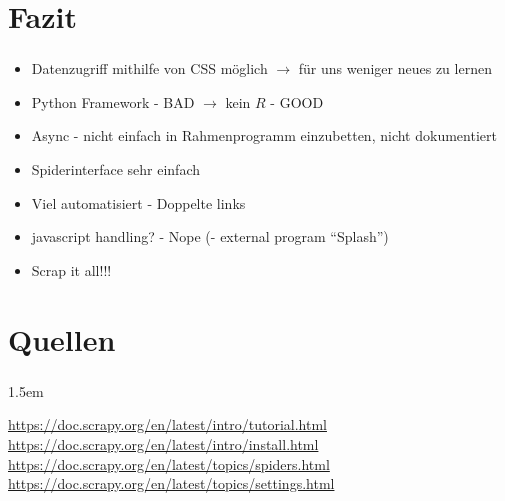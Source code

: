 \documentclass{beamer}
\begin{document}

\section{Fazit}
\begin{frame}
	\frametitle{\insertsection{}}
	\begin{itemize}
	  \item Datenzugriff mithilfe von CSS möglich $\rightarrow$ für uns weniger
	  neues zu lernen
	  \item Python Framework - BAD $\rightarrow$ kein $R$ - GOOD
	  \item Async - nicht einfach in Rahmenprogramm einzubetten, nicht dokumentiert
	  \item Spiderinterface sehr einfach
	  \item Viel automatisiert - Doppelte links
	  \item javascript handling? - Nope (- external program ``Splash'')
	  \item Scrap it all!!!
	\end{itemize}
\end{frame}


\section{Quellen}
\begin{frame}
	\frametitle{\insertsection{}}
	\emergencystretch 1.5em
	{\small
	\begin{thebibliography}{8}
		\url{https://doc.scrapy.org/en/latest/intro/tutorial.html}
		\url{https://doc.scrapy.org/en/latest/intro/install.html}
		\url{https://doc.scrapy.org/en/latest/topics/spiders.html}
		\url{https://doc.scrapy.org/en/latest/topics/settings.html}
	\end{thebibliography}
	}
\end{frame}
\end{document}
